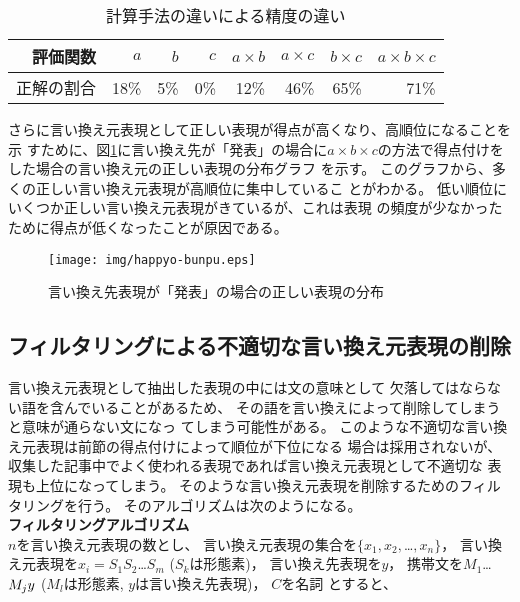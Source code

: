 \documentclass[jnlpbbl]{jnlp_j}
\begin{document}
\begin{table}[htb]
\caption{計算手法の違いによる精度の違い}
\label{score7}
\begin{center}
\begin{tabular}{|r||r|r|r|r|r|r|r|} \hline
評価関数  & $a$  & $b$ & $c$ & $a \times b$ & $a \times c$ & $b \times c$ &
 $a \times b \times c$ \\\hline\hline
正解の割合&18\%&5\%&0\%& 12\% & 46\% & 65\% &  71\%   \\\hline
\end{tabular}
\end{center}
\end{table}

さらに言い換え元表現として正しい表現が得点が高くなり、高順位になることを示
すために、図\ref{happyo-bunpu}に言い換え先が「発表」の場合に$a \times b
\times c$の方法で得点付けをした場合の言い換え元の正しい表現の分布グラフ
を示す。
このグラフから、多くの正しい言い換え元表現が高順位に集中しているこ
とがわかる。
低い順位にいくつか正しい言い換え元表現がきているが、これは表現
の頻度が少なかったために得点が低くなったことが原因である。

\begin{figure}[htb]
\begin{center}
\texttt{[image: img/happyo-bunpu.eps]}
\caption{言い換え先表現が「発表」の場合の正しい表現の分布}
\label{happyo-bunpu}
\end{center}
\end{figure}


\subsection{フィルタリングによる不適切な言い換え元表現の削除}\label{sub:filter}

言い換え元表現として抽出した表現の中には文の意味として
欠落してはならない語を含んでいることがあるため、
その語を言い換えによって削除してしまうと意味が通らない文になっ
てしまう可能性がある。
このような不適切な言い換え元表現は前節の得点付けによって順位が下位になる
場合は採用されないが、
収集した記事中でよく使われる表現であれば言い換え元表現として不適切な
表現も上位になってしまう。
そのような言い換え元表現を削除するためのフィルタリングを行う。
そのアルゴリズムは次のようになる。
\\

\noindent\textbf{フィルタリングアルゴリズム}\\
\noindent
$n$を言い換え元表現の数とし、
言い換え元表現の集合を$\{x_1,x_2,$…$,x_n\}$，
言い換え元表現を$x_i = S_{1} S_{2}$…$S_{m}$ ($S_{k}$は形態素)，
言い換え先表現を$y$，
携帯文を$M_{1} $…$ M_{j} \/y$ ($M_{l}$は形態素,\/ $y$は言い換え先表現)，
$C$を名詞
とすると、\\
\end{document}
